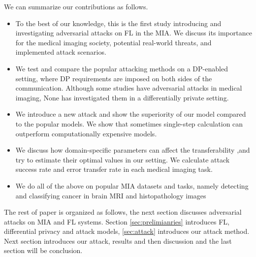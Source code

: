 We can summarize our contributions as follows.

\begin{itemize}
  \item To the best of our knowledge, this is the first study introducing and investigating adversarial attacks on FL in the MIA. We discuss its importance for the medical imaging society, potential real-world threats, and implemented attack scenarios.

\item We test and compare the popular attacking methods on a DP-enabled setting, where DP requirements are imposed on both sides of the communication. Although some studies have adversarial attacks in medical imaging, None has investigated them in a differentially private setting.

  \item  We introduce a new attack and show the superiority of our model compared to the popular models. We show that sometimes single-step calculation can outperform computationally expensive models.
    \item We discuss how domain-specific parameters can affect the transferability ,and try to estimate their optimal values in our setting. We calculate attack success rate and error transfer rate in each medical imaging task.
  \item We do all of the above on popular MIA datasets and tasks, namely detecting and classifying cancer in brain MRI and histopathology images
  
\end{itemize}


The rest of paper is organized as follows, the next section discusses adversarial attacks on MIA and FL systems. Section \ref{sec:prelimianries} introduces FL, differential privacy and attack models,  \ref{sec:attack} introduces our attack method. Next section introduces our attack, results and then discussion and the last section will be conclusion.

